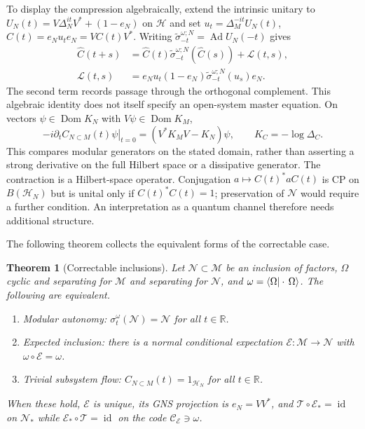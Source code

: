 \documentclass[a4paper,11pt]{article}
\newtheorem{theorem}{Theorem}
\theoremstyle{definition}
\newcommand{\nn}{\nonumber}
\newcommand{\mE}{\mathcal{E}}
\begin{document}
To display the compression algebraically, extend the intrinsic unitary to
$U_N(t)=V\Delta_N^{it}V^*+(1-e_N)$ on $\mathcal H$ and set
$u_t=\Delta_M^{-it}U_N(t)$, $\widehat C(t)=e_Nu_te_N=VC(t)V^*$.
Writing $\widetilde\sigma^{\omega;N}_{-t}=\operatorname{Ad}U_N(-t)$ gives
\begin{align}
 \widehat C(t+s)&=\widehat C(t)\widetilde\sigma^{\omega;N}_{-t}(\widehat C(s))
                  +\mathcal L(t,s),\nn\\
 \mathcal L(t,s)&=e_Nu_t(1-e_N)\widetilde\sigma^{\omega;N}_{-t}(u_s)e_N.
\end{align}
The second term records passage through the orthogonal complement. This algebraic
identity does not itself specify an open-system master equation.
On vectors $\psi\in\operatorname{Dom}K_N$ with $V\psi\in\operatorname{Dom}K_M$,
\begin{equation}
 -i\left.\partial_t C_{N\subset M}(t)\psi\right|_{t=0}
 =(V^*K_MV-K_N)\psi,\qquad K_C=-\log\Delta_C.
\end{equation}
This compares modular generators on the stated domain, rather than asserting
a strong derivative on the full Hilbert space or a dissipative generator.
The contraction is a Hilbert-space operator. Conjugation
$a\mapsto C(t)^*aC(t)$ is CP on $B(\mathcal H_N)$ but is unital only if
$C(t)^*C(t)=1$; preservation of $\mathcal N$ would require a further condition.
An interpretation as a quantum channel therefore needs additional structure.

The following theorem collects the equivalent forms of the correctable case.
\begin{theorem}[Correctable inclusions]\label{thm:correctable}
Let $\mathcal N\subset\mathcal M$ be an inclusion of factors, $\Omega$ cyclic and separating for $\mathcal M$ and separating for $\mathcal N$, and $\omega=\braket{\Omega|\cdot\,\Omega}$. The following are equivalent.
\begin{enumerate}
 \item[\rm(i)] \emph{Modular autonomy:} $\sigma^{\omega}_t(\mathcal N)=\mathcal N$ for all $t\in\mathbb R$.
 \item[\rm(ii)] \emph{Expected inclusion:} there is a normal conditional expectation $\mE:\mathcal M\to\mathcal N$ with $\omega\circ\mE=\omega$.
 \item[\rm(iii)] \emph{Trivial subsystem flow:} $C_{N\subset M}(t)=1_{\mathcal H_N}$ for all $t\in\mathbb R$.
\end{enumerate}
When these hold, $\mE$ is unique, its GNS projection is $e_N=VV^*$, and $\mathcal T\circ\mE_*=\operatorname{id}$ on $\mathcal N_*$ while $\mE_*\circ\mathcal T=\operatorname{id}$ on the code $\mathcal C_{\mE}\ni\omega$.
\end{theorem}
\end{document}
